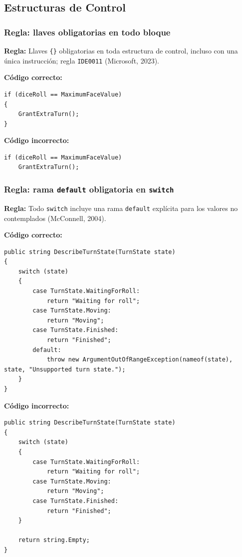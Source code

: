 \subsection{Estructuras de Control}

\subsubsection{Regla: llaves obligatorias en todo bloque}

\textbf{Regla:} Llaves \texttt{\{\}} obligatorias en toda estructura de control, incluso con una única instrucción; regla \texttt{IDE0011} (Microsoft, 2023).

\textbf{Código correcto:}
\begin{lstlisting}[style=csharpstyle]
if (diceRoll == MaximumFaceValue)
{
    GrantExtraTurn();
}
\end{lstlisting}

\textbf{Código incorrecto:}
\begin{lstlisting}[style=csharpstyle]
if (diceRoll == MaximumFaceValue)
    GrantExtraTurn();
\end{lstlisting}

\subsubsection{Regla: rama \texttt{default} obligatoria en \texttt{switch}}

\textbf{Regla:} Todo \texttt{switch} incluye una rama \texttt{default} explícita para los valores no contemplados (McConnell, 2004).

\textbf{Código correcto:}
\begin{lstlisting}[style=csharpstyle]
public string DescribeTurnState(TurnState state)
{
    switch (state)
    {
        case TurnState.WaitingForRoll:
            return "Waiting for roll";
        case TurnState.Moving:
            return "Moving";
        case TurnState.Finished:
            return "Finished";
        default:
            throw new ArgumentOutOfRangeException(nameof(state), state, "Unsupported turn state.");
    }
}
\end{lstlisting}

\textbf{Código incorrecto:}
\begin{lstlisting}[style=csharpstyle]
public string DescribeTurnState(TurnState state)
{
    switch (state)
    {
        case TurnState.WaitingForRoll:
            return "Waiting for roll";
        case TurnState.Moving:
            return "Moving";
        case TurnState.Finished:
            return "Finished";
    }

    return string.Empty;
}
\end{lstlisting}
